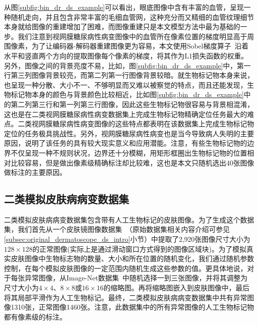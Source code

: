 从图\ref{subfig:bin_dr_ds_example}可以看出，眼底图像中含有丰富的血管，呈现一种随机走向，并且包含非常丰富的毛细血管网，这种充分而又精细的血管纹理细节本身就给图像的重建增加了困难，而图像重建只是本文模型方法中最为基础的一步。我们注意到视网膜糖尿病性病变图像中的血管所在像素位置的梯度明显高于周围像素，为了让编码器-解码器重建图像更为容易，本文使用Sobel梯度算子~\cite{sobel2014history}沿着水平和竖直两个方向的提取图像每个像素的梯度，将其作为L1损失函数的权重。另外，图像之间的背景亮度不易，比如，图\ref{subfig:bin_dr_ds_example}中，第一行第三列图像背景较亮，而第二列第一行图像背景较暗。就生物标记物本身来说，也呈现一种分散、大小不一、不够明显而又难以被察觉的特点，而且还能发现，生物标记物本身的颜色与背景颜色比较相近，比如图\ref{subfig:bin_dr_ds_example}中的第二列第三行和第一列第三行图像，因此这些生物标记物很容易与背景相混淆，这也是在二类视网膜糖尿病性病变数据集上完成生物标记物精确定位任务最大的难点。二类视网膜糖尿病性病变图像的这些特点都表明在该数据集上完成生物标记物定位的任务极具挑战性。另外，视网膜糖尿病性病变也是当今导致病人失明的主要原因，说明了该任务的具有较大现实意义和应用潜能。注意，有些生物标记物的边界不仅呈现一种不规则状况，边界还十分模糊，用矩形框圈出生物标记物的位置相对比较容易，但是做出像素级精确标注却比较难，这也是本文只随机选出40张图像做标注的主要原因。

\subsection{二类模拟皮肤病病变数据集}\label{subsec:bin_simulated_skin_ds}
二类模拟皮肤病病变数据集包含带有人工生物标记的皮肤图像。为了生成这个数据集，我们首先从一个皮肤镜图像数据集~\cite{codella2018skin}（原始数据集相关内容介绍可参见\ref{subsec:original_dermatoscope_ds_intro}小节）中提取了2,920张图像尺寸大小为$128\times128$的正常图像(实际上是通过滑动窗口方式得到的图像区域块)。为了模拟真实皮肤图像中生物标志物的数量、大小和所在位置的随机变化，我们通过随机参数控制，在每个模拟皮肤图像的一定范围内随机生成这些参数的值。更具体地说，对于每张异常图像，从Image-Net数据集~\cite{deng2009imagenet}中随机选择一到三张图像，并将其调整为尺寸大小为$4\times 4$、$8\times 8$或$16\times 16$的缩略图。再将缩略图嵌入到皮肤图像中，最后将其局部平滑作为人工生物标记。最终，二类模拟皮肤病病变数据集中共有异常图像1310张，正常图像1460张。注意，此数据集中的所有异常图像的人工生物标记物都有像素级的标注。

